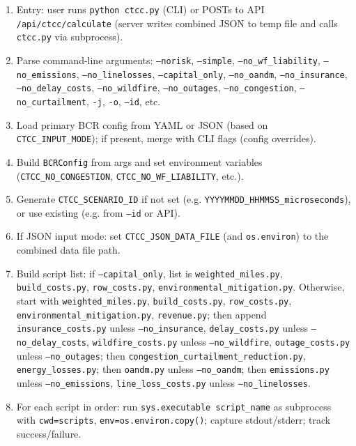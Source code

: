 \documentclass[ctcc_full_documentation.tex]{subfiles}
\begin{document}
\begin{enumerate}[leftmargin=*]
    \item Entry: user runs \texttt{python ctcc.py} (CLI) or POSTs to API \texttt{/api/ctcc/calculate} (server writes combined JSON to temp file and calls \texttt{ctcc.py} via subprocess).
    \item Parse command-line arguments: \texttt{--norisk}, \texttt{--simple}, \texttt{--no\_wf\_liability}, \texttt{--no\_emissions}, \texttt{--no\_linelosses}, \texttt{--capital\_only}, \texttt{--no\_oandm}, \texttt{--no\_insurance}, \texttt{--no\_delay\_costs}, \texttt{--no\_wildfire}, \texttt{--no\_outages}, \texttt{--no\_congestion}, \texttt{--no\_curtailment}, \texttt{-j}, \texttt{-o}, \texttt{--id}, etc.
    \item Load primary BCR config from YAML or JSON (based on \texttt{CTCC\_INPUT\_MODE}); if present, merge with CLI flags (config overrides).
    \item Build \texttt{BCRConfig} from args and set environment variables (\texttt{CTCC\_NO\_CONGESTION}, \texttt{CTCC\_NO\_WF\_LIABILITY}, etc.).
    \item Generate \texttt{CTCC\_SCENARIO\_ID} if not set (e.g. \texttt{YYYYMMDD\_HHMMSS\_microseconds}), or use existing (e.g. from \texttt{--id} or API).
    \item If JSON input mode: set \texttt{CTCC\_JSON\_DATA\_FILE} (and \texttt{os.environ}) to the combined data file path.
    \item Build script list: if \texttt{--capital\_only}, list is \texttt{weighted\_miles.py}, \texttt{build\_costs.py}, \texttt{row\_costs.py}, \texttt{environmental\_mitigation.py}. Otherwise, start with \texttt{weighted\_miles.py}, \texttt{build\_costs.py}, \texttt{row\_costs.py}, \texttt{environmental\_mitigation.py}, \texttt{revenue.py}; then append \texttt{insurance\_costs.py} unless \texttt{--no\_insurance}, \texttt{delay\_costs.py} unless \texttt{--no\_delay\_costs}, \texttt{wildfire\_costs.py} unless \texttt{--no\_wildfire}, \texttt{outage\_costs.py} unless \texttt{--no\_outages}; then \texttt{congestion\_curtailment\_reduction.py}, \texttt{energy\_losses.py}; then \texttt{oandm.py} unless \texttt{--no\_oandm}; then \texttt{emissions.py} unless \texttt{--no\_emissions}, \texttt{line\_loss\_costs.py} unless \texttt{--no\_linelosses}.
    \item For each script in order: run \texttt{sys.executable script\_name} as subprocess with \texttt{cwd=scripts}, \texttt{env=os.environ.copy()}; capture stdout/stderr; track success/failure.

\end{enumerate}
\end{document}
